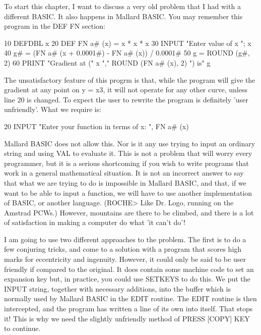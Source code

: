 To start this chapter, I want to discuss a very old problem that I had with  a 
different  BASIC.  It  also happens in Mallard BASIC. You  may  remember  this 
program in the DEF FN section:

        10 DEFDBL x
        20 DEF FN a# (x) = x * x * x
        30 INPUT "Enter value of x "; x
        40 g# = (FN a# (x + 0.0001#) - FN a# (x)) / 0.0001#
        50 g = ROUND (g#, 2)
        60 PRINT "Gradient at (" x "," ROUND (FN a# (x), 2) ") is" g

The unsatisfactory feature of this progrm is that, while the program will give 
the gradient at any point on y = x3, it will not operate for any other  curve, 
unless  line  20  is changed. To expect the user to  rewrite  the  program  is 
definitely 'user unfriendly'. What we require is:

        20 INPUT "Enter your function in terms of x: ", FN a# (x)

Mallard  BASIC  does  not allow this. Nor is it any use  trying  to  input  an 
ordinary string and using VAL to evaluate it. This is not a problem that  will 
worry  every programmer, but it is a serious shortcoming if you wish to  write 
programs that work in a general mathematical situation. It is not an incorrect 
answer  to say that what we are trying to do is impossible in  Mallard  BASIC, 
and  that,  if  we want to be able to input a function, we will  have  to  use 
another  implementation of BASIC, or another language. (ROCHE> Like Dr.  Logo, 
running on the Amstrad PCWs.) However, mountains are there to be climbed,  and 
there is a lot of satisfaction in making a computer do what 'it can't do'!

I am going to use two different approaches to the problem. The first is to  do 
a few conjuring tricks, and come to a solution with a program that scores high 
marks  for  eccentricity and ingenuity. However, it could only be said  to  be 
user  friendly if compared to the original. It does contain some machine  code 
to set an expansion key but, in practice, you could use SETKEYS to do this. We 
put the INPUT string, together with necessary additions, into the buffer which 
is  normally  used by Mallard BASIC in the EDIT routine. The EDIT  routine  is 
then  intercepted, and the program has written a line of its own into  itself. 
That  stops  it! This is why we need the slightly unfriendly method  of  PRESS 
[COPY] KEY to continue.

